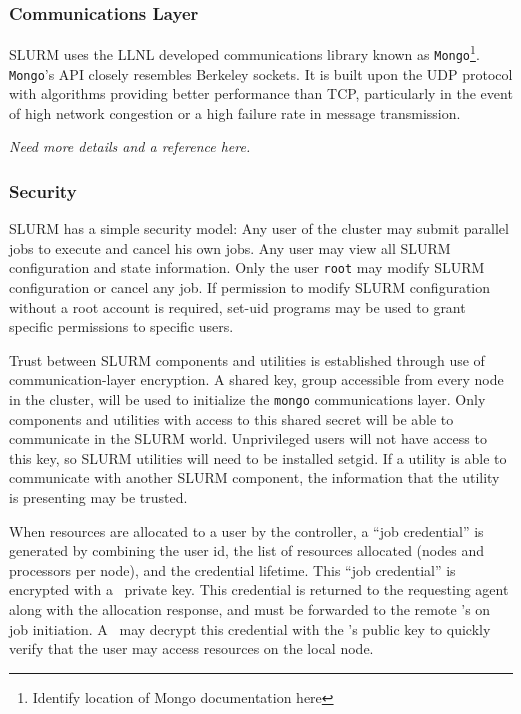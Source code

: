 \subsubsection{Communications Layer}

SLURM uses the LLNL developed communications library known as 
{\tt Mongo}\footnote{Identify location of Mongo documentation here}. 
{\tt Mongo}'s API closely resembles Berkeley sockets. It is built upon the UDP 
protocol with algorithms providing better performance than TCP, particularly 
in the event of high network congestion or a high failure rate in message 
transmission. 

{\em Need more details and a reference here.}

\subsubsection{Security}

SLURM has a simple security model: 
Any user of the cluster may submit parallel jobs to execute and cancel
his own jobs.  Any user may view all SLURM configuration and state
information.  Only the user {\tt root} may modify SLURM configuration or
cancel any job.  If permission to modify SLURM configuration without a
root account is required, set-uid programs may be used to grant specific
permissions to specific users.

Trust between SLURM components and utilities is established through use
of communication-layer encryption. A shared key, group accessible from
every node in the cluster, will be used to initialize the {\tt mongo}
communications layer. Only components and utilities with access to this
shared secret will be able to communicate in the SLURM world. Unprivileged
users will not have access to this key, so SLURM utilities will need to be
installed setgid. If a utility is able to communicate with another SLURM
component, the information that the utility is presenting may be trusted.

When resources are allocated to a user by the controller, a ``job 
credential'' is generated by combining the user id, the list of
resources allocated (nodes and processors per node), and the credential
lifetime. This ``job credential'' is encrypted with a \slurmctld\ private key. 
This credential is returned to the requesting agent along with the
allocation response, and must be forwarded to the remote \slurmd 's 
on job initiation. A \slurmd\ may decrypt this credential with the
\slurmctld 's public key to quickly verify that the user may access
resources on the local node. 

